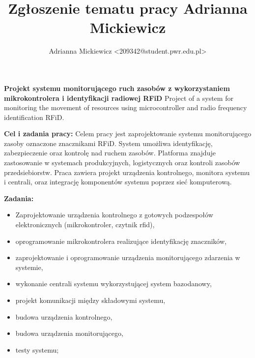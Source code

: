 \documentclass[
12pt, %
a4paper
]{report}
\title{Zgłoszenie tematu pracy Adrianna Mickiewicz}
\author{Adrianna Mickiewicz <209342@student.pwr.edu.pl>}
\begin{document}
	
	\thispagestyle{empty}
	\begin{center}
		\noindent\textbf{\Large{Projekt systemu monitorującego ruch zasobów z wykorzystaniem mikrokontrolera i identyfikacji radiowej RFiD}}
		\noindent Project of a system for monitoring the movement of resources using microcontroller and radio frequency identification RFiD.
	\end{center}
	\vspace{1em}
	
	\noindent\textbf{Cel i zadania pracy:}
			Celem pracy jest zaprojektowanie systemu monitorującego zasoby oznaczone znacznikami RFiD. 
			System umożliwa identyfikację, zabezpieczenie oraz kontrolę nad ruchem zasobów.
			Platforma znajduje zastosowanie w systemach produkcyjnych, logistycznych oraz kontroli zasobów przedsiebiorstw. 
			Praca zawiera projekt urządzenia kontrolnego, monitora systemu i centrali, oraz integrację komponentów systemu poprzez sieć komputerową.
        \vspace{1em}
 
         \noindent\textbf{Zadania:}
         \begin{itemize}
                \item Zaprojektowanie urządzenia kontrolnego z gotowych podzespołów elektronicznych (mikrokontroler, czytnik rfid),
		\item oprogramowanie mikrokontrolera realizujące identyfikację znaczników,
		\item zaprojektowanie i oprogramowanie urządzenia monitorującego zdarzenia w systemie,
		\item wykonanie centrali systemu wykorzystującej system bazodanowy, 
		\item projekt komunikacji między składowymi systemu,
		\item budowa urządzenia kontrolnego,
		\item budowa urządzenia monitorującego,
		\item testy systemu;
         \end{itemize}
\end{document}
